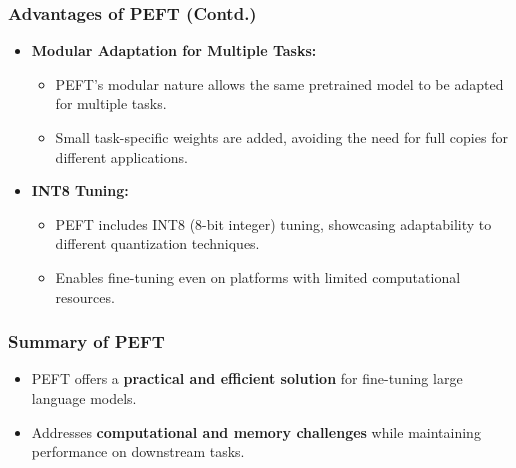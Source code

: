 \begin{frame}[fragile]\frametitle{Advantages of PEFT (Contd.)}
  \begin{itemize}
    \item \textbf{Modular Adaptation for Multiple Tasks:}
      \begin{itemize}
        \item PEFT's modular nature allows the same pretrained model to be adapted for multiple tasks.
        \item Small task-specific weights are added, avoiding the need for full copies for different applications.
      \end{itemize}
    \item \textbf{INT8 Tuning:}
      \begin{itemize}
        \item PEFT includes INT8 (8-bit integer) tuning, showcasing adaptability to different quantization techniques.
        \item Enables fine-tuning even on platforms with limited computational resources.
      \end{itemize}
  \end{itemize}
\end{frame}

\begin{frame}[fragile]\frametitle{Summary of PEFT}
  \begin{itemize}
    \item PEFT offers a \textbf{practical and efficient solution} for fine-tuning large language models.
    \item Addresses \textbf{computational and memory challenges} while maintaining performance on downstream tasks.
  \end{itemize}
\end{frame}




